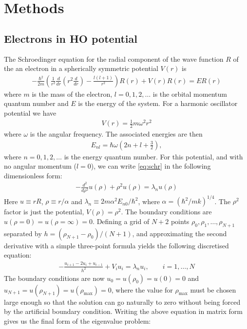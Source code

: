\documentclass{article}
\newcommand{\lrp}[1]{\left(#1\right)}
\begin{document}
\section{Methods}
\subsection{Electrons in HO potential} \label{section:prob}
The Schroedinger equation for the radial component of the wave function $R$ of the an electron in a spherically symmetric potential $V(r)$ is
\begin{align}
	-\frac{\hbar^2}{2m}\lrp{\frac{1}{r^2}\frac{d}{dr}\lrp{r^2\frac{d}{dr}} - \frac{l(l+1)}{r^2}}R(r) + V(r)R(r) = ER(r) \label{eq:schr}
\end{align}
where $m$ is the mass of the electron, $l=0,1,2,\ldots$ is the orbital momentum quantum number and $E$ is the energy of the system. For a harmonic oscillator potential we have 
\begin{align*}
	V(r) = \frac{1}{2}m\omega^2r^2
\end{align*}
where $\omega$ is the angular frequency. The associated energies are then
\begin{align*}
	E_{nl} = \hbar\omega\lrp{2n + l + \frac{3}{2}},
\end{align*}
where $n = 0, 1, 2, \ldots$ is the energy quantum number. For this potential, and with no angular momentum ($l = 0$), we can write \ref{eq:schr} in the following dimensionless form:
\begin{align*}
	-\frac{d^2}{d\rho^2}u(\rho) + \rho^2u(\rho) = \lambda_n u(\rho)
\end{align*}
Here $u \equiv rR$, $\rho \equiv r/\alpha$ and $\lambda_n \equiv 2m\alpha^2E_{n0}/\hbar^2$, where $\alpha = (\hbar^2/mk)^{1/4}$. The $\rho^2$ factor is just the potential, $V(\rho) = \rho^2$. The boundary conditions are $u(\rho = 0) = u(\rho = \infty) = 0$. Defining a grid of $N+2$ points $\rho_0, \rho_1, \ldots, \rho_{N+1}$ separated by $h = (\rho_{N+1} - \rho_0)/(N+1)$, and approximating the second derivative with a simple three-point formula yields the following discretised equation:
\begin{align*}
	-\frac{u_{i+1} - 2u_i + u_{i-1}}{h^2} + V_iu_i = \lambda_n u_i, \qquad i = 1, \ldots, N
\end{align*}
The boundary conditions are now $u_0 = u(\rho_0) = u(0) = 0$ and $u_{N+1} = u(\rho_{N+1}) = u(\rho_\text{max}) = 0$, where the value for $\rho_\text{max}$ must be chosen large enough so that the solution can go naturally to zero without being forced by the artificial boundary condition. Writing the above equation in matrix form gives us the final form of the eigenvalue problem:
\end{document}
